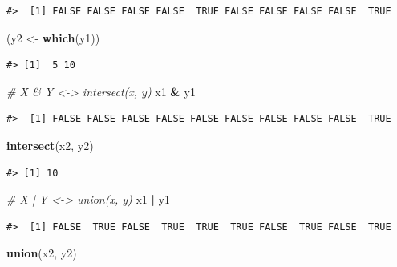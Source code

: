 \documentclass[]{book}
\newenvironment{Shaded}{\begin{snugshade}}{\end{snugshade}}
\newcommand{\KeywordTok}[1]{\textcolor[rgb]{0.13,0.29,0.53}{\textbf{#1}}}
\newcommand{\StringTok}[1]{\textcolor[rgb]{0.31,0.60,0.02}{#1}}
\newcommand{\CommentTok}[1]{\textcolor[rgb]{0.56,0.35,0.01}{\textit{#1}}}
\newcommand{\OperatorTok}[1]{\textcolor[rgb]{0.81,0.36,0.00}{\textbf{#1}}}
\newcommand{\NormalTok}[1]{#1}
\theoremstyle{definition}
\theoremstyle{definition}
\theoremstyle{definition}
\theoremstyle{remark}
\begin{document}
\begin{verbatim}
#>  [1] FALSE FALSE FALSE FALSE  TRUE FALSE FALSE FALSE FALSE  TRUE
\end{verbatim}

\begin{Shaded}
\begin{Highlighting}[]
\NormalTok{(y2 <-}\StringTok{ }\KeywordTok{which}\NormalTok{(y1))}
\end{Highlighting}
\end{Shaded}

\begin{verbatim}
#> [1]  5 10
\end{verbatim}

\begin{Shaded}
\begin{Highlighting}[]
\CommentTok{# X & Y <-> intersect(x, y)}
\NormalTok{x1 }\OperatorTok{&}\StringTok{ }\NormalTok{y1}
\end{Highlighting}
\end{Shaded}

\begin{verbatim}
#>  [1] FALSE FALSE FALSE FALSE FALSE FALSE FALSE FALSE FALSE  TRUE
\end{verbatim}

\begin{Shaded}
\begin{Highlighting}[]
\KeywordTok{intersect}\NormalTok{(x2, y2)}
\end{Highlighting}
\end{Shaded}

\begin{verbatim}
#> [1] 10
\end{verbatim}

\begin{Shaded}
\begin{Highlighting}[]
\CommentTok{# X | Y <-> union(x, y)}
\NormalTok{x1 }\OperatorTok{|}\StringTok{ }\NormalTok{y1}
\end{Highlighting}
\end{Shaded}

\begin{verbatim}
#>  [1] FALSE  TRUE FALSE  TRUE  TRUE  TRUE FALSE  TRUE FALSE  TRUE
\end{verbatim}

\begin{Shaded}
\begin{Highlighting}[]
\KeywordTok{union}\NormalTok{(x2, y2)}
\end{Highlighting}
\end{Shaded}
\end{document}
